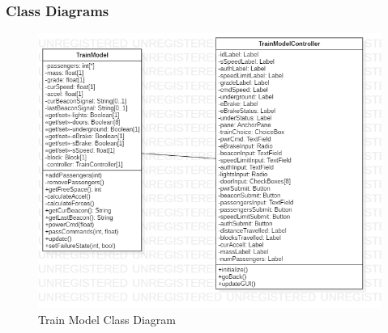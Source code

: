 \documentclass{article}
\begin{document}
    \subsubsection{Class Diagrams}
    \begin{figure}[H]
        \centering
        \includegraphics[width=\textwidth]{./TrainModel/TrainModel_ClassDiagram.png}
        \caption{Train Model Class Diagram}
        \label{fig:Train Model Class Diagram}
    \end{figure}
    
\end{document}
